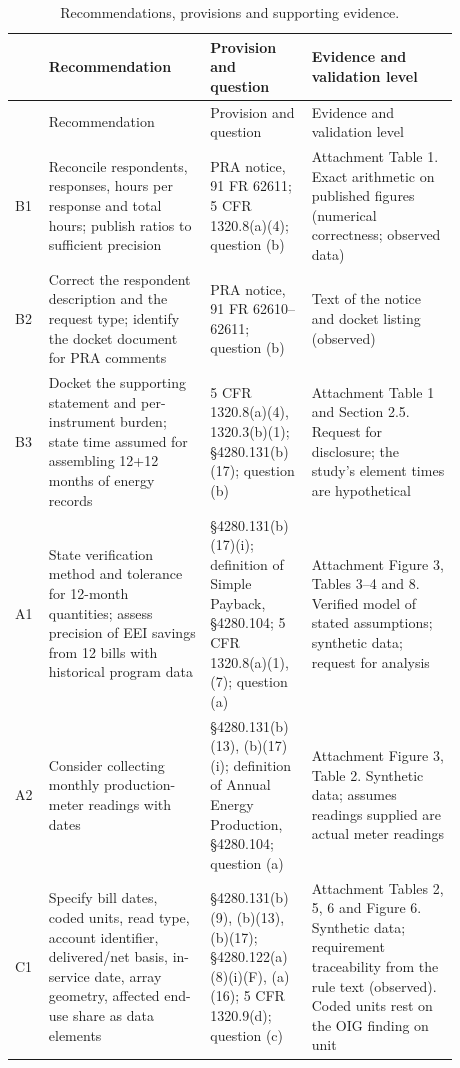 \documentclass[11pt]{article}
\begin{document}
{\footnotesize
\begin{longtable}{p{0.05\linewidth}p{0.33\linewidth}p{0.2\linewidth}p{0.3\linewidth}}
\caption{Recommendations, provisions and supporting evidence.}\label{tab:recs}\\
\hline
 & Recommendation & Provision and question & Evidence and validation level \\
\hline
\endfirsthead
\hline
 & Recommendation & Provision and question & Evidence and validation level \\
\hline
\endhead
B1 & Reconcile respondents, responses, hours per response and total hours; publish
ratios to sufficient precision & PRA notice, 91 FR 62611; 5 CFR 1320.8(a)(4); question
(b) & Attachment Table 1. Exact arithmetic on published figures (numerical correctness;
observed data) \\
B2 & Correct the respondent description and the request type; identify the docket
document for PRA comments & PRA notice, 91 FR 62610--62611; question (b) & Text of the
notice and docket listing (observed) \\
B3 & Docket the supporting statement and per-instrument burden; state time assumed for
assembling 12+12 months of energy records & 5 CFR 1320.8(a)(4), 1320.3(b)(1);
\S4280.131(b)(17); question (b) & Attachment Table 1 and Section 2.5. Request for
disclosure; the study's element times are hypothetical \\
A1 & State verification method and tolerance for 12-month quantities; assess precision
of EEI savings from 12 bills with historical program data & \S4280.131(b)(17)(i);
definition of Simple Payback, \S4280.104; 5 CFR 1320.8(a)(1), (7); question (a) &
Attachment Figure 3, Tables 3--4 and 8. Verified model of stated assumptions; synthetic
data; request for analysis \\
A2 & Consider collecting monthly production-meter readings with dates & \S4280.131(b)(13),
(b)(17)(i); definition of Annual Energy Production, \S4280.104; question (a) &
Attachment Figure 3, Table 2. Synthetic data; assumes readings supplied are actual
meter readings \\
C1 & Specify bill dates, coded units, read type, account identifier, delivered/net
basis, in-service date, array geometry, affected end-use share as data elements &
\S4280.131(b)(9), (b)(13), (b)(17); \S4280.122(a)(8)(i)(F), (a)(16); 5 CFR 1320.9(d);
question (c) & Attachment Tables 2, 5, 6 and Figure 6. Synthetic data; requirement
traceability from the rule text (observed). Coded units rest on the OIG finding on unit

\end{longtable}}
\end{document}
